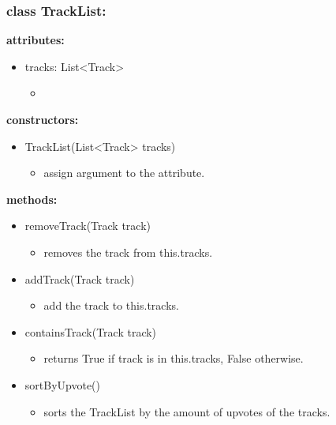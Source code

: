 \documentclass[oneside, nenglish]{sdqtechreport}
\begin{document}
\subsubsection{class TrackList:}
\textbf{attributes:}
\begin{itemize}
    \item tracks: List<Track>
    \begin{itemize}
        \item 
    \end{itemize}
\end{itemize}

\textbf{constructors:}
\begin{itemize}
    \item TrackList(List<Track> tracks) 
    \begin{itemize}
        \item assign argument to the attribute.
    \end{itemize}
\end{itemize}

\textbf{methods:}
\begin{itemize}
    \item removeTrack(Track track)
    \begin{itemize}
        \item removes the track from this.tracks.
    \end{itemize}
    \item addTrack(Track track)
    \begin{itemize}
        \item add the track to this.tracks.
    \end{itemize}
    \item containsTrack(Track track)
    \begin{itemize}
        \item returns True if track is in this.tracks, False otherwise.
    \end{itemize}
    \item sortByUpvote()
    \begin{itemize}
        \item sorts the TrackList by the amount of upvotes of the tracks.
    \end{itemize}
\end{itemize}
\end{document}
